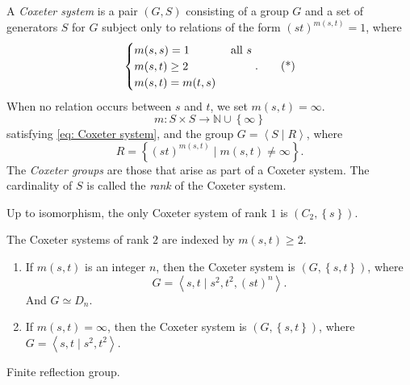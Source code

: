 \begin{definition}
  A \emph{Coxeter system} is a pair \( (G, S) \) consisting of a group \( G \) and a set of generators \( S \) for \( G \) subject only to relations of the form \( (st)^{m(s, t)} = 1 \), where
  \begin{equation}
    \begin{cases}
      m(s, s) = 1 & \textmd{ all } s\\
      m(s, t) \geq 2\\
      m(s, t) = m(t, s)
    \end{cases}.
    \tag{*} \label{eq: Coxeter system}
  \end{equation}
  When no relation occurs between \( s \) and \( t \), we set \( m(s, t) = \infty \).
  \[
    m: S \times S \to \mathbb{N} \cup \left\lbrace \infty \right\rbrace
  \]
  satisfying \cref{eq: Coxeter system}, and the group \( G = \left\langle S \mid R \right\rangle \), where
  \[
    R = \left\lbrace (st)^{m(s, t)} \mid m(s, t) \neq \infty \right\rbrace.
  \]
  The \emph{Coxeter groups} are those that arise as part of a Coxeter system.
  The cardinality of \( S \) is called the \emph{rank} of the Coxeter system.
\end{definition}

\begin{example}
  Up to isomorphism, the only Coxeter system of rank \( 1 \) is \( (C_2, \left\lbrace s \right\rbrace) \).
\end{example}
\begin{example}
  The Coxeter systems of rank \( 2 \) are indexed by \( m(s, t) \geq 2 \).
  \begin{enumerate}
    \item If \( m(s, t) \) is an integer \( n \), then the Coxeter system is \( (G, \left\lbrace s, t \right\rbrace) \), where
      \[
        G = \left\langle s, t \mid s^2, t^2, (st)^n \right\rangle.
      \]
      And \( G \simeq D_n \).
    \item If \( m(s, t) = \infty \), then the Coxeter system is \( (G, \left\lbrace s, t \right\rbrace) \), where \( G = \left\langle s, t \mid s^2, t^2 \right\rangle \).
  \end{enumerate}
\end{example}

\begin{example}
  Finite reflection group.
\end{example}

